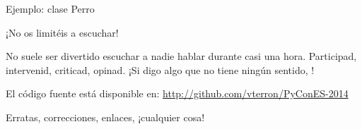\begin{frame}{Ejemplo: clase Perro}
\end{frame}

\begin{frame}{¡No os limitéis a escuchar!}
  \begin{center}
    No suele ser divertido escuchar a nadie hablar durante casi una
    hora. Participad, intervenid, criticad, opinad. ¡Si digo algo que
    no tiene ningún sentido, !
  \end{center}

  \begin{block}{\centering El código fuente está disponible en:}
    \centering \url{http://github.com/vterron/PyConES-2014}
  \end{block}

  \begin{center}
    \small Erratas, correcciones, enlaces, ¡cualquier cosa!
  \end{center}
\end{frame}
